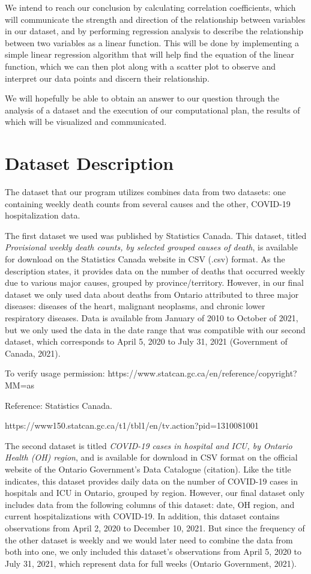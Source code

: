 \documentclass[fontsize=11pt]{article}
\begin{document}
\noindent
We intend to reach our conclusion by calculating correlation coefficients, which will communicate the strength and direction of the relationship between variables in our dataset, and by performing regression analysis to describe the relationship between two variables as a linear function. This will be done by implementing a simple linear regression algorithm that will help find the equation of the linear function, which we can then plot along with a scatter plot to observe and interpret our data points and discern their relationship.

\noindent
We will hopefully be able to obtain an answer to our question through the analysis of a dataset and the execution of our computational plan, the results of which will be visualized and communicated.


\section*{Dataset Description}

The dataset that our program utilizes combines data from two datasets: one containing weekly death counts from several causes and the other, COVID-19 hospitalization data.  

\noindent
The first dataset we used was published by Statistics Canada. This dataset, titled \textit{Provisional weekly death counts, by selected grouped causes of death}, is available for download on the Statistics Canada website in CSV (.csv) format. As the description states, it provides data on the number of deaths that occurred weekly due to various major causes, grouped by province/territory. However, in our final dataset we only used data about deaths from Ontario attributed to three major diseases: diseases of the heart, malignant neoplasms, and chronic lower respiratory diseases. Data is available from January of 2010 to October of 2021, but we only used the data in the date range that was compatible with our second dataset, which corresponds to April 5, 2020 to July 31, 2021 (Government of Canada, 2021).

To verify usage permission: https://www.statcan.gc.ca/en/reference/copyright?MM=as

Reference: Statistics Canada.

https://www150.statcan.gc.ca/t1/tbl1/en/tv.action?pid=1310081001

\noindent
The second dataset is titled \textit{COVID-19 cases in hospital and ICU, by Ontario Health (OH) region}, and is available for download in CSV format on the official website of the Ontario Government’s Data Catalogue (citation). Like the title indicates, this dataset provides daily data on the number of COVID-19 cases in hospitals and ICU in Ontario, grouped by region. However, our final dataset only includes data from the following columns of this dataset: date, OH region, and current hospitalizations with COVID-19. In addition, this dataset contains observations from April 2, 2020 to December 10, 2021. But since the frequency of the other dataset is weekly and we would later need to combine the data from both into one, we only included this dataset’s observations from April 5, 2020 to July 31, 2021, which represent data for full weeks (Ontario Government, 2021).
\end{document}
